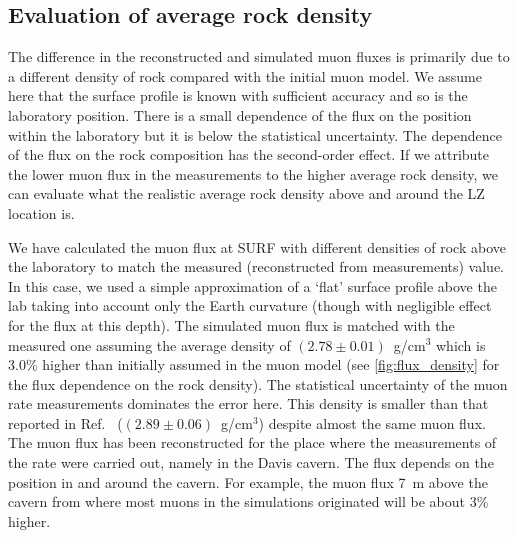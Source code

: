 \subsection{Evaluation of average rock density}

The difference in the reconstructed and simulated muon fluxes is primarily due to a different density of rock compared with the initial muon model. We assume here that the surface profile is known with sufficient accuracy and so is the laboratory position. There is a small dependence of the flux on the position within the laboratory but it is below the statistical uncertainty. The dependence of the flux on the rock composition has the second-order effect. If we attribute the lower muon flux in the measurements to the higher average rock density, we can evaluate what the realistic average rock density above and around the LZ location is. 

We have calculated the muon flux at SURF with different densities of rock above the laboratory to match the measured (reconstructed from measurements) value. In this case, we used a simple approximation of a `flat' surface profile above the lab taking into account only the Earth curvature (though with negligible effect for the flux at this depth). The simulated muon flux is matched with the measured one assuming the average density of $(2.78 \pm 0.01)$~g/cm$^3$ which is 3.0\% higher than initially assumed in the muon model (see \autoref{fig:flux_density} for the flux dependence on the rock density). The statistical uncertainty of the muon rate measurements dominates the error here. This density is smaller than that reported in Ref.~\cite{majorana} ($(2.89 \pm 0.06)$~g/cm$^3$) despite almost the same muon flux. 
The muon flux has been reconstructed for the place where the measurements of the rate were carried out, namely in the Davis cavern. The flux depends on the position in and around the cavern. For example, the muon flux 7~m above the cavern from where most muons in the simulations originated will be about 3\% higher. 

